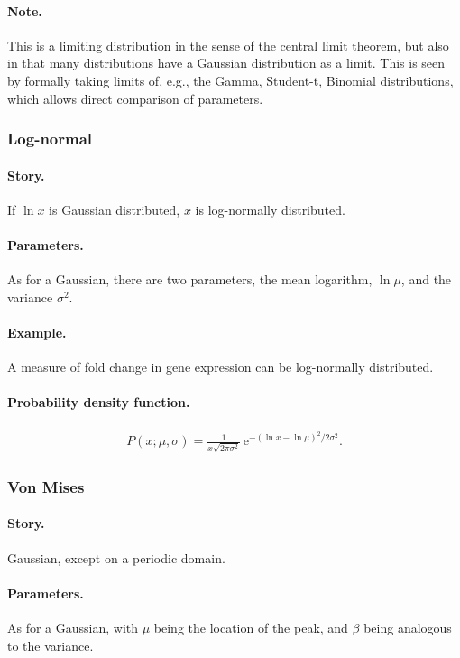 \paragraph{Note.} This is a limiting distribution in the sense of the
central limit theorem, but also in that many distributions have a
Gaussian distribution as a limit.  This is seen by formally taking
limits of, e.g., the Gamma, Student-t, Binomial distributions, which
allows direct comparison of parameters.


\subsubsection{Log-normal}
\paragraph{Story.} If $\ln x$ is Gaussian distributed, $x$ is
log-normally distributed.
\paragraph{Parameters.} As for a Gaussian, there are two parameters,
the mean logarithm, $\ln \mu$, and the variance $\sigma^2$.
\paragraph{Example.} A measure of fold change in gene expression can
be log-normally distributed.
\paragraph{Probability density function.}
\begin{align}
P(x;\mu, \sigma) = \frac{1}{x\sqrt{2\pi \sigma^2}}\,\mathrm{e}^{-(\ln x - \ln \mu)^2/2\sigma^2}.
\end{align}


\subsubsection{Von Mises}
\paragraph{Story.} Gaussian, except on a periodic domain.
\paragraph{Parameters.} As for a Gaussian, with $\mu$ being the
location of the peak, and $\beta$ being analogous to the variance.
